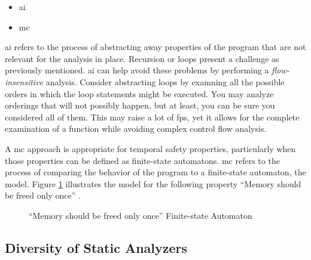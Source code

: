 \begin{itemize}
    \item \Gls{ai}
    \item \Gls{mc}
\end{itemize}

\Gls{ai} refers to the process of abstracting away properties of the program that are not relevant for the analysis in place. Recursion or loops present a challenge as previously mentioned. \Gls{ai} can help avoid these problems by performing a \emph{flow-insensitive} analysis. Consider abstracting loops by examning all the possible orders in which the loop statements might be executed. You may analyze orderings that will not possibly happen, but at least, you can be sure you considered all of them. This may raise a lot of \glspl{fp}, yet it allows for the complete examination of a function while avoiding complex control flow analysis.

A \gls{mc} approach is appropriate for temporal safety properties, particularly when those properties can be defined as finite-state automatons. \Gls{mc} refers to the process of comparing the behavior of the program to a finite-state automaton, the model. Figure \ref{fig:finite-state-automaton} illustrates the model for the following property ``Memory should be freed only once'' \cite{chess2007secure}.

\vspace{1cm}

\begin{figure}[ht]
    \centering
    \caption{``Memory should be freed only once'' Finite-state Automaton \cite{chess2007secure}}
    \label{fig:finite-state-automaton}
\end{figure}

\subsection{Diversity of Static Analyzers}
\label{sub:diversity-of-static-analyzers}

